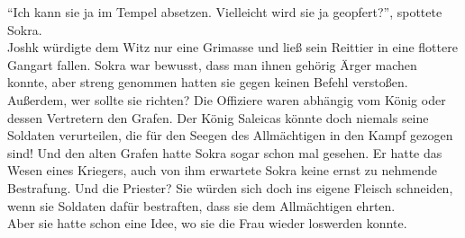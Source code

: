 ``Ich kann sie ja im Tempel absetzen. Vielleicht wird sie ja geopfert?'', spottete Sokra.\\
Joshk würdigte dem Witz nur eine Grimasse und ließ sein Reittier in eine flottere Gangart fallen.
Sokra war bewusst, dass man ihnen gehörig Ärger machen konnte, aber streng genommen hatten sie gegen 
keinen Befehl verstoßen. Außerdem, wer sollte sie richten? Die Offiziere waren abhängig vom König 
oder dessen Vertretern den Grafen. Der König Saleicas könnte doch niemals seine Soldaten 
verurteilen, die für den Seegen des Allmächtigen in den Kampf gezogen sind! Und den alten Grafen 
hatte Sokra sogar schon mal gesehen. Er hatte das Wesen eines Kriegers, auch von ihm erwartete Sokra 
keine ernst zu nehmende Bestrafung. Und die Priester? Sie würden sich doch ins eigene Fleisch 
schneiden, wenn sie Soldaten dafür bestraften, dass sie dem Allmächtigen ehrten.\\
Aber sie hatte schon eine Idee, wo sie die Frau wieder loswerden konnte.\\



